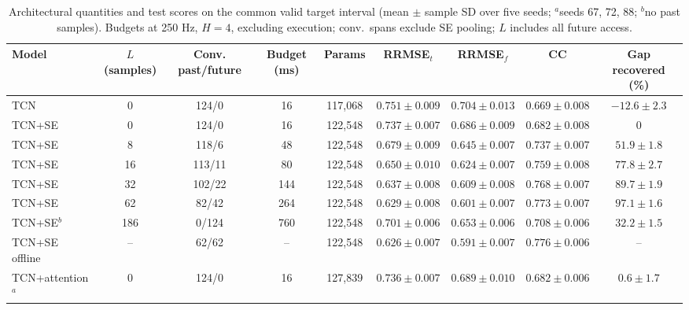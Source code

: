 \documentclass[letterpaper,journal]{IEEEtran}
\begin{document}
\begin{table}[t]
\caption{Architectural quantities and test scores on the common valid target interval (mean $\pm$ sample SD over five seeds; $^a$seeds 67, 72, 88; $^b$no past samples). Budgets at 250 Hz, $H=4$, excluding execution; conv.\ spans exclude SE pooling; $L$ includes all future access.}
\label{tab:accuracy}
\centering\footnotesize
\begin{tabular*}{\textwidth}{@{\extracolsep{\fill}}lcccccccc@{}}
\toprule
Model & $L$ (samples) & Conv. past/future & Budget (ms) & Params & RRMSE$_t$ & RRMSE$_f$ & CC & Gap recovered (\%)\\
\midrule
TCN & 0 & 124/0 & 16 & 117,068 & $0.751{\pm}0.009$ & $0.704{\pm}0.013$ & $0.669{\pm}0.008$ & $-12.6{\pm}2.3$\\
TCN+SE & 0 & 124/0 & 16 & 122,548 & $0.737{\pm}0.007$ & $0.686{\pm}0.009$ & $0.682{\pm}0.008$ & 0\\
TCN+SE & 8 & 118/6 & 48 & 122,548 & $0.679{\pm}0.009$ & $0.645{\pm}0.007$ & $0.737{\pm}0.007$ & $51.9{\pm}1.8$\\
TCN+SE & 16 & 113/11 & 80 & 122,548 & $0.650{\pm}0.010$ & $0.624{\pm}0.007$ & $0.759{\pm}0.008$ & $77.8{\pm}2.7$\\
TCN+SE & 32 & 102/22 & 144 & 122,548 & $0.637{\pm}0.008$ & $0.609{\pm}0.008$ & $0.768{\pm}0.007$ & $89.7{\pm}1.9$\\
TCN+SE & 62 & 82/42 & 264 & 122,548 & $0.629{\pm}0.008$ & $0.601{\pm}0.007$ & $0.773{\pm}0.007$ & $97.1{\pm}1.6$\\
TCN+SE$^b$ & 186 & 0/124 & 760 & 122,548 & $0.701{\pm}0.006$ & $0.653{\pm}0.006$ & $0.708{\pm}0.006$ & $32.2{\pm}1.5$\\
TCN+SE offline & -- & 62/62 & -- & 122,548 & $0.626{\pm}0.007$ & $0.591{\pm}0.007$ & $0.776{\pm}0.006$ & --\\
TCN+attention$^a$ & 0 & 124/0 & 16 & 127,839 & $0.736{\pm}0.007$ & $0.689{\pm}0.010$ & $0.682{\pm}0.006$ & $0.6{\pm}1.7$\\
\bottomrule
\end{tabular*}
\end{table}
\end{document}
